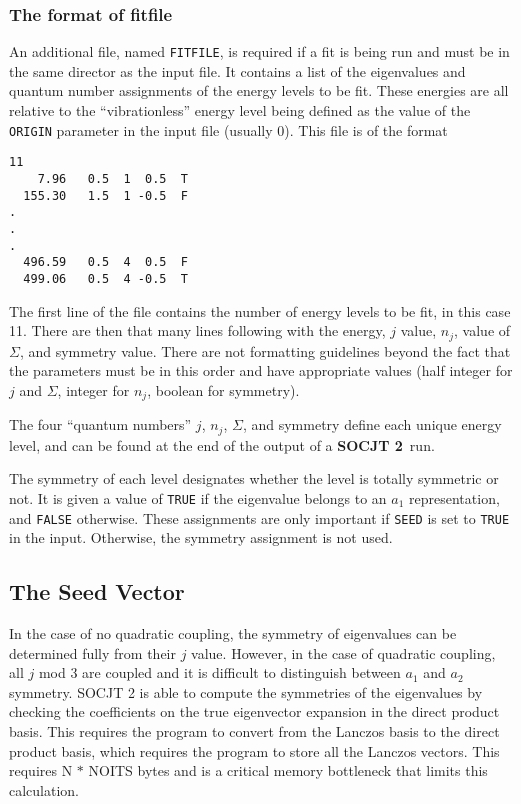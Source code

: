 \documentclass{article}
\newcommand{\socjttwo}{{\bf SOCJT 2}}
\begin{document}
\subsubsection{The format of fitfile} \label{section:fitting:file}

An additional file, named {\tt FITFILE}, is required if a fit is being run and must be in the same director as the input file. It contains a list
of the eigenvalues and quantum number assignments of the energy levels to
be fit. These energies are all relative to the ``vibrationless''
energy level being defined as the value of the {\tt ORIGIN} parameter in the input file (usually 0). This file is of the format 
\begin{verbatim}
11
    7.96   0.5  1  0.5	T
  155.30   1.5  1 -0.5	F
.
.
.
  496.59   0.5  4  0.5	F
  499.06   0.5  4 -0.5	T
\end{verbatim}
The first line of the file contains the number of energy levels to be
fit, in this case 11.  There are then that many lines following with
the energy, $j$ value, $n_j$, value of $\Sigma $, and symmetry value. There are not formatting guidelines beyond the fact that the parameters must be in this order and have appropriate values (half integer for $j$ and $\Sigma$, integer for $n_j$, boolean for symmetry).

The four ``quantum numbers'' $j$,
$n_j$, $\Sigma$, and symmetry define each unique energy level, and can be found
at the end of the output of a \socjttwo\ run. 

The symmetry of each level designates whether the level is totally symmetric or not. It is given a value of \texttt{TRUE} if the eigenvalue belongs to an $a_1$ representation, and \texttt{FALSE} otherwise. These assignments are only important if \texttt{SEED} is set to \texttt{TRUE} in the input. Otherwise, the symmetry assignment is not used.

\subsection{The Seed Vector}

In the case of no quadratic coupling, the symmetry of eigenvalues can be determined fully from their $j$ value. However, in the case of quadratic coupling, all $j$ mod 3 are coupled and it is difficult to distinguish between $a_1$ and $a_2$ symmetry. SOCJT 2 is able to compute the symmetries of the eigenvalues by checking the coefficients on the true eigenvector expansion in the direct product basis. This requires the program to convert from the Lanczos basis to the direct product basis, which requires the program to store all the Lanczos vectors. This requires N $*$ NOITS bytes and is a critical memory bottleneck that limits this calculation.
\end{document}
